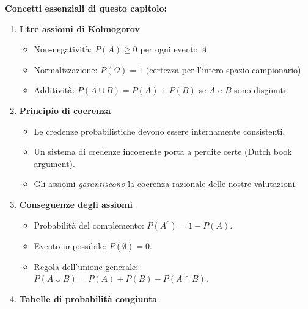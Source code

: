 \documentclass[
  italian,
  letterpaper,
  a4paper,
  11pt,
  open=any]{scrbook}
\providecommand{\tightlist}{%
  \setlength{\itemsep}{0pt}\setlength{\parskip}{0pt}}
\theoremstyle{plain}
\theoremstyle{definition}
\theoremstyle{definition}
\theoremstyle{remark}
\begin{document}

\begin{tcolorbox}[enhanced jigsaw, arc=.35mm, bottomrule=.15mm, bottomtitle=1mm, breakable, colback=white, colbacktitle=quarto-callout-important-color!10!white, colframe=quarto-callout-important-color-frame, coltitle=black, left=2mm, leftrule=.75mm, opacityback=0, opacitybacktitle=0.6, rightrule=.15mm, title=\textcolor{quarto-callout-important-color}{\faExclamation}\hspace{0.5em}{Importante}, titlerule=0mm, toprule=.15mm, toptitle=1mm]

\textbf{Concetti essenziali di questo capitolo:}

\begin{enumerate}
\def\labelenumi{\arabic{enumi}.}
\item
  \textbf{I tre assiomi di Kolmogorov}

  \begin{itemize}
  \tightlist
  \item
    Non-negatività: \(P(A) \geq 0\) per ogni evento \(A\).
  \item
    Normalizzazione: \(P(\Omega) = 1\) (certezza per l'intero spazio
    campionario).
  \item
    Additività: \(P(A \cup B) = P(A) + P(B)\) se \(A\) e \(B\) sono
    disgiunti.
  \end{itemize}
\item
  \textbf{Principio di coerenza}

  \begin{itemize}
  \tightlist
  \item
    Le credenze probabilistiche devono essere internamente consistenti.
  \item
    Un sistema di credenze incoerente porta a perdite certe (Dutch book
    argument).
  \item
    Gli assiomi \emph{garantiscono} la coerenza razionale delle nostre
    valutazioni.
  \end{itemize}
\item
  \textbf{Conseguenze degli assiomi}

  \begin{itemize}
  \tightlist
  \item
    Probabilità del complemento: \(P(A^c) = 1 - P(A)\).
  \item
    Evento impossibile: \(P(\emptyset) = 0\).
  \item
    Regola dell'unione generale:
    \(P(A \cup B) = P(A) + P(B) - P(A \cap B)\).
  \end{itemize}
\item
  \textbf{Tabelle di probabilità congiunta}


\end{enumerate}
\end{tcolorbox}
\end{document}
